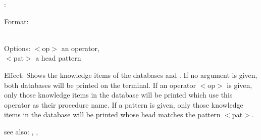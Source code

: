 :

Format: \\
        \\

Options: $<$op$>$ an operator,\\
         $<$pat$>$ a head pattern

Effect: Shows the knowledge items of the databases  and 
	. If no argument is given, both databases will 
	be printed on the terminal. If an operator $<$op$>$ is given, only those 
	knowledge items in the database will be printed which use this operator
	as their procedure name. If a pattern is given, only those knowledge
	items in the database will be printed whose head matches the pattern
	$<$pat$>$.

see also: \consult, , \listing
